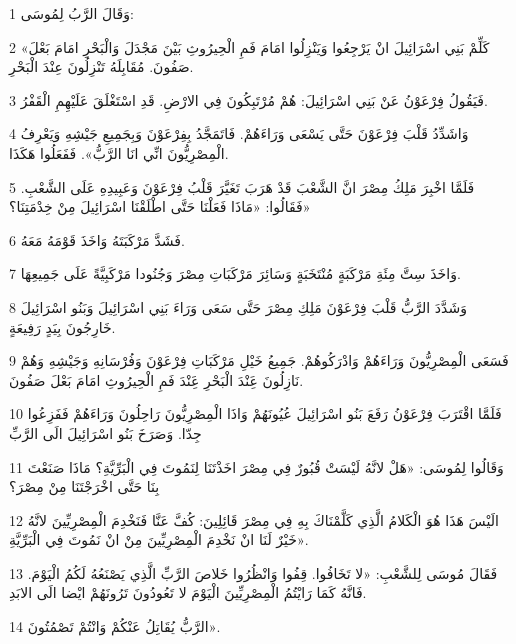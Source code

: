 \par 1 وَقَالَ الرَّبُ لِمُوسَى:
\par 2 «كَلِّمْ بَنِي اسْرَائِيلَ انْ يَرْجِعُوا وَيَنْزِلُوا امَامَ فَمِ الْحِيرُوثِ بَيْنَ مَجْدَلَ وَالْبَحْرِ امَامَ بَعْلَ صَفُونَ. مُقَابِلَهُ تَنْزِلُونَ عِنْدَ الْبَحْرِ.
\par 3 فَيَقُولُ فِرْعَوْنُ عَنْ بَنِي اسْرَائِيلَ: هُمْ مُرْتَبِكُونَ فِي الارْضِ. قَدِ اسْتَغْلَقَ عَلَيْهِمِ الْقَفْرُ.
\par 4 وَاشَدِّدُ قَلْبَ فِرْعَوْنَ حَتَّى يَسْعَى وَرَاءَهُمْ. فَاتَمَجَّدُ بِفِرْعَوْنَ وَبِجَمِيعِ جَيْشِهِ وَيَعْرِفُ الْمِصْرِيُّونَ انِّي انَا الرَّبُّ». فَفَعَلُوا هَكَذَا.
\par 5 فَلَمَّا اخْبِرَ مَلِكُ مِصْرَ انَّ الشَّعْبَ قَدْ هَرَبَ تَغَيَّرَ قَلْبُ فِرْعَوْنَ وَعَبِيدِهِ عَلَى الشَّعْبِ. فَقَالُوا: «مَاذَا فَعَلْنَا حَتَّى اطْلَقْنَا اسْرَائِيلَ مِنْ خِدْمَتِنَا؟»
\par 6 فَشَدَّ مَرْكَبَتَهُ وَاخَذَ قَوْمَهُ مَعَهُ.
\par 7 وَاخَذَ سِتَّ مِئَةِ مَرْكَبَةٍ مُنْتَخَبَةٍ وَسَائِرَ مَرْكَبَاتِ مِصْرَ وَجُنُودا مَرْكَبِيَّةً عَلَى جَمِيعِهَا.
\par 8 وَشَدَّدَ الرَّبُّ قَلْبَ فِرْعَوْنَ مَلِكِ مِصْرَ حَتَّى سَعَى وَرَاءَ بَنِي اسْرَائِيلَ وَبَنُو اسْرَائِيلَ خَارِجُونَ بِيَدٍ رَفِيعَةٍ.
\par 9 فَسَعَى الْمِصْرِيُّونَ وَرَاءَهُمْ وَادْرَكُوهُمْ. جَمِيعُ خَيْلِ مَرْكَبَاتِ فِرْعَوْنَ وَفُرْسَانِهِ وَجَيْشِهِ وَهُمْ نَازِلُونَ عَِنْدَ الْبَحْرِ عَِنْدَ فَمِ الْحِيرُوثِ امَامَ بَعْلَ صَفُونَ.
\par 10 فَلَمَّا اقْتَرَبَ فِرْعَوْنُ رَفَعَ بَنُو اسْرَائِيلَ عُيُونَهُمْ وَاذَا الْمِصْرِيُّونَ رَاحِلُونَ وَرَاءَهُمْ فَفَزِعُوا جِدّا. وَصَرَخَ بَنُو اسْرَائِيلَ الَى الرَّبِّ
\par 11 وَقَالُوا لِمُوسَى: «هَلْ لانَّهُ لَيْسَتْ قُبُورٌ فِي مِصْرَ اخَذْتَنَا لِنَمُوتَ فِي الْبَرِّيَّةِ؟ مَاذَا صَنَعْتَ بِنَا حَتَّى اخْرَجْتَنَا مِنْ مِصْرَ؟
\par 12 الَيْسَ هَذَا هُوَ الْكَلامُ الَّذِي كَلَّمْنَاكَ بِهِ فِي مِصْرَ قَائِلِينَ: كُفَّ عَنَّا فَنَخْدِمَ الْمِصْرِيِّينَ لانَّهُ خَيْرٌ لَنَا انْ نَخْدِمَ الْمِصْرِيِّينَ مِنْ انْ نَمُوتَ فِي الْبَرِّيَّةِ».
\par 13 فَقَالَ مُوسَى لِلشَّعْبِ: «لا تَخَافُوا. قِفُوا وَانْظُرُوا خَلاصَ الرَّبِّ الَّذِي يَصْنَعُهُ لَكُمُ الْيَوْمَ. فَانَّهُ كَمَا رَايْتُمُ الْمِصْرِيِّينَ الْيَوْمَ لا تَعُودُونَ تَرُونَهُمْ ايْضا الَى الابَدِ.
\par 14 الرَّبُّ يُقَاتِلُ عَنْكُمْ وَانْتُمْ تَصْمُتُونَ».
